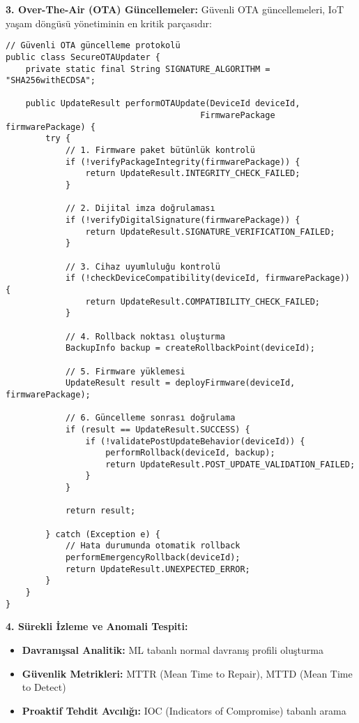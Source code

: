 \textbf{3. Over-The-Air (OTA) Güncellemeler:}
Güvenli OTA güncellemeleri, IoT yaşam döngüsü yönetiminin en kritik parçasıdır:

\begin{lstlisting}[breaklines=true,basicstyle=\ttfamily\footnotesize]
// Güvenli OTA güncelleme protokolü
public class SecureOTAUpdater {
    private static final String SIGNATURE_ALGORITHM = "SHA256withECDSA";
    
    public UpdateResult performOTAUpdate(DeviceId deviceId, 
                                       FirmwarePackage firmwarePackage) {
        try {
            // 1. Firmware paket bütünlük kontrolü
            if (!verifyPackageIntegrity(firmwarePackage)) {
                return UpdateResult.INTEGRITY_CHECK_FAILED;
            }
            
            // 2. Dijital imza doğrulaması
            if (!verifyDigitalSignature(firmwarePackage)) {
                return UpdateResult.SIGNATURE_VERIFICATION_FAILED;
            }
            
            // 3. Cihaz uyumluluğu kontrolü
            if (!checkDeviceCompatibility(deviceId, firmwarePackage)) {
                return UpdateResult.COMPATIBILITY_CHECK_FAILED;
            }
            
            // 4. Rollback noktası oluşturma
            BackupInfo backup = createRollbackPoint(deviceId);
            
            // 5. Firmware yüklemesi
            UpdateResult result = deployFirmware(deviceId, firmwarePackage);
            
            // 6. Güncelleme sonrası doğrulama
            if (result == UpdateResult.SUCCESS) {
                if (!validatePostUpdateBehavior(deviceId)) {
                    performRollback(deviceId, backup);
                    return UpdateResult.POST_UPDATE_VALIDATION_FAILED;
                }
            }
            
            return result;
            
        } catch (Exception e) {
            // Hata durumunda otomatik rollback
            performEmergencyRollback(deviceId);
            return UpdateResult.UNEXPECTED_ERROR;
        }
    }
}
\end{lstlisting}

\textbf{4. Sürekli İzleme ve Anomali Tespiti:}
\begin{itemize}
    \item \textbf{Davranışsal Analitik:} ML tabanlı normal davranış profili oluşturma
    \item \textbf{Güvenlik Metrikleri:} MTTR (Mean Time to Repair), MTTD (Mean Time to Detect)
    \item \textbf{Proaktif Tehdit Avcılığı:} IOC (Indicators of Compromise) tabanlı arama
\end{itemize}

